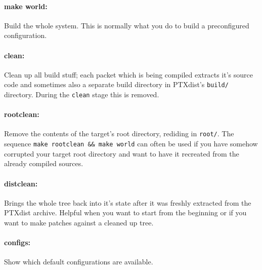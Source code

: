 \paragraph{make world:} Build the whole system. This is normally what
you do to build a preconfigured configuration. 

\paragraph{clean:} Clean up all build stuff; each packet which is being
compiled extracts it's source code and sometimes also a separate build
directory in PTXdist's \texttt{build/} directory. During the
\texttt{clean} stage this is removed. 

\paragraph{rootclean:} Remove the contents of the target's root
directory, rediding in \texttt{root/}. The sequence \texttt{make
rootclean \&\& make world} can often be used if you have somehow
corrupted your target root directory and want to have it recreated from
the already compiled sources. 

\paragraph{distclean:} Brings the whole tree back into it's state after
it was freshly extracted from the PTXdist archive. Helpful when you want
to start from the beginning or if you want to make patches against a
cleaned up tree. 

\paragraph{configs:} Show which default configurations are available. 

